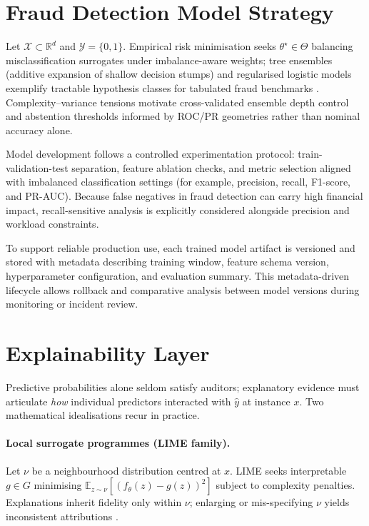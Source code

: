 \section{Fraud Detection Model Strategy}
Let $\mathcal{X}\subset\mathbb{R}^d$ and $\mathcal{Y}=\{0,1\}$. Empirical risk minimisation seeks $\theta^\star\in\Theta$ balancing misclassification surrogates under imbalance-aware weights; tree ensembles (additive expansion of shallow decision stumps) and regularised logistic models exemplify tractable hypothesis classes for tabulated fraud benchmarks \cite{fraud_handbook,mldotnet_docs}. Complexity--variance tensions motivate cross-validated ensemble depth control and abstention thresholds informed by ROC/PR geometries rather than nominal accuracy alone.

Model development follows a controlled experimentation protocol: train-validation-test separation, feature ablation checks, and metric selection aligned with imbalanced classification settings (for example, precision, recall, F1-score, and PR-AUC). Because false negatives in fraud detection can carry high financial impact, recall-sensitive analysis is explicitly considered alongside precision and workload constraints.

To support reliable production use, each trained model artifact is versioned and stored with metadata describing training window, feature schema version, hyperparameter configuration, and evaluation summary. This metadata-driven lifecycle allows rollback and comparative analysis between model versions during monitoring or incident review.

\section{Explainability Layer}
Predictive probabilities alone seldom satisfy auditors; explanatory evidence must articulate \emph{how} individual predictors interacted with $\hat{y}$ at instance $x$. Two mathematical idealisations recur in practice.

\paragraph{Local surrogate programmes (LIME family).}
Let $\nu$ be a neighbourhood distribution centred at $x$. LIME seeks interpretable $g \in G$ minimising $\mathbb{E}_{z\sim\nu}[(f_\theta(z)-g(z))^2]$ subject to complexity penalties. Explanations inherit fidelity only within $\nu$; enlarging or mis-specifying $\nu$ yields inconsistent attributions \cite{lime_original,xai_survey}.

